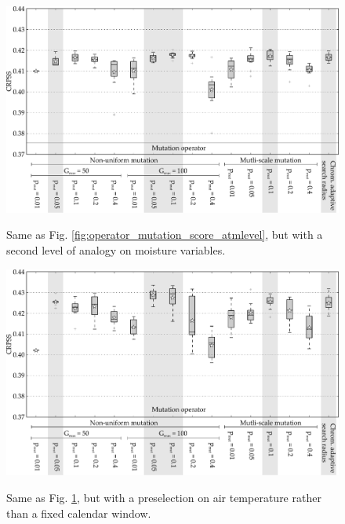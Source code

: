 \documentclass{ametsoc}
\begin{document}
\begin{figure}[t]
	\begin{center}
		\noindent\includegraphics[width=33pc,angle=0]{fig10.pdf}\\
	\end{center}
	\caption{Same as Fig. \ref{fig:operator_mutation_score_atmlevel}, but with a second level of analogy on moisture variables.}
	\label{fig:operator_mutation_score_r2}
\end{figure}

\begin{figure}[t]
	\begin{center}
		\noindent\includegraphics[width=33pc,angle=0]{fig11.pdf}\\
	\end{center}
	\caption{Same as Fig. \ref{fig:operator_mutation_score_r2}, but with a preselection on air temperature rather than a fixed calendar window.}
	\label{fig:operator_mutation_score_r4}
\end{figure}
\end{document}
